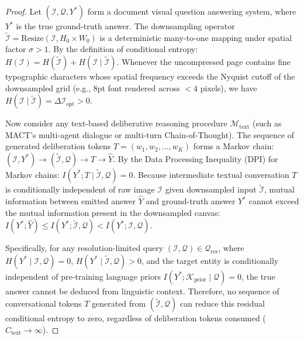 \documentclass[11pt]{article}
\begin{document}
\begin{proof}
Let $(\mathcal{I}, \mathcal{Q}, Y^*)$ form a document visual question answering system, where $Y^*$ is the true ground-truth answer. The downsampling operator $\tilde{\mathcal{I}} = \text{Resize}(\mathcal{I}, H_0 \times W_0)$ is a deterministic many-to-one mapping under spatial factor $\sigma > 1$. By the definition of conditional entropy: $H(\mathcal{I}) = H(\tilde{\mathcal{I}}) + H(\mathcal{I} \mid \tilde{\mathcal{I}})$. Whenever the uncompressed page contains fine typographic characters whose spatial frequency exceeds the Nyquist cutoff of the downsampled grid (e.g., 8pt font rendered across $< 4$ pixels), we have $H(\mathcal{I} \mid \tilde{\mathcal{I}}) = \Delta \mathcal{I}_{\text{opt}} > 0$.

Now consider any text-based deliberative reasoning procedure $\mathcal{M}_{\text{text}}$ (such as MACT's multi-agent dialogue or multi-turn Chain-of-Thought). The sequence of generated deliberation tokens $T = (w_1, w_2, \dots, w_K)$ forms a Markov chain: $(\mathcal{I}, Y^*) \longrightarrow (\tilde{\mathcal{I}}, \mathcal{Q}) \longrightarrow T \longrightarrow \hat{Y}$. By the Data Processing Inequality (DPI) for Markov chains: $I(Y^*; T \mid \tilde{\mathcal{I}}, \mathcal{Q}) = 0$. Because intermediate textual conversation $T$ is conditionally independent of raw image $\mathcal{I}$ given downsampled input $\tilde{\mathcal{I}}$, mutual information between emitted answer $\hat{Y}$ and ground-truth answer $Y^*$ cannot exceed the mutual information present in the downsampled canvas: $I(Y^*; \hat{Y}) \le I(Y^*; \tilde{\mathcal{I}}, \mathcal{Q}) < I(Y^*; \mathcal{I}, \mathcal{Q})$.

Specifically, for any resolution-limited query $(\mathcal{I}, \mathcal{Q}) \in \mathcal{Q}_{\text{res}}$, where $H(Y^* \mid \mathcal{I}, \mathcal{Q}) = 0$, $H(Y^* \mid \tilde{\mathcal{I}}, \mathcal{Q}) > 0$, and the target entity is conditionally independent of pre-training language priors $I(Y^*; \mathcal{K}_{\text{prior}} \mid \mathcal{Q}) = 0$, the true answer cannot be deduced from linguistic context. Therefore, no sequence of conversational tokens $T$ generated from $(\tilde{\mathcal{I}}, \mathcal{Q})$ can reduce this residual conditional entropy to zero, regardless of deliberation tokens consumed ($C_{\text{text}} \to \infty$).


\end{proof}
\end{document}

